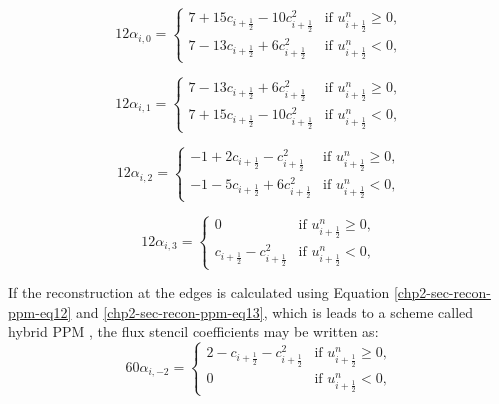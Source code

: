 \begin{equation*}
	12\alpha_{i,0} =  
    	\begin{cases}
		7 + 15c_{i+\frac{1}{2}} - 10c_{i+\frac{1}{2}}^2 
		& \text{if } u_{i+\frac{1}{2}}^n \geq 0,\\
		7 - 13c_{i+\frac{1}{2}}  +  6c_{i+\frac{1}{2}}^2 & \text{if } u_{i+\frac{1}{2}}^n<0,
    	\end{cases}
\end{equation*}

\begin{equation*}
	12\alpha_{i,1} =  
    	\begin{cases}
		7 - 13c_{i+\frac{1}{2}} +  6c_{i+\frac{1}{2}}^2 & \text{if } u_{i+\frac{1}{2}}^n \geq 0,\\
		7 + 15c_{i+\frac{1}{2}} - 10c_{i+\frac{1}{2}}^2 & \text{if } u_{i+\frac{1}{2}}^n<0,
    	\end{cases}
\end{equation*}

\begin{equation*}
	12\alpha_{i,2} =  
    	\begin{cases}
		-1 +  2c_{i+\frac{1}{2}} -   c_{i+\frac{1}{2}}^2 
		& \text{if } u_{i+\frac{1}{2}}^n \geq 0,\\
		-1 - 5c_{i+\frac{1}{2}} +  6c_{i+\frac{1}{2}}^2 & \text{if } u_{i+\frac{1}{2}}^n<0,
    	\end{cases}
\end{equation*}

\begin{equation*}
	12\alpha_{i,3} =  
    	\begin{cases}
		0 & \text{if } u_{i+\frac{1}{2}}^n \geq 0,\\
		c_{i+\frac{1}{2}}-   c_{i+\frac{1}{2}}^2 & \text{if } u_{i+\frac{1}{2}}^n<0,
    	\end{cases}
\end{equation*}

If the reconstruction at the edges is calculated using Equation \eqref{chp2-sec-recon-ppm-eq12}
and \eqref{chp2-sec-recon-ppm-eq13}, which is leads to a scheme called hybrid PPM \citep{putman:2007}, 
the flux stencil coefficients may be written as:
\begin{equation*}
	60\alpha_{i,-2} =  
    	\begin{cases}
		2 - c_{i+\frac{1}{2}}-c_{i+\frac{1}{2}}^2 &
		\text{if } u_{i+\frac{1}{2}}^n \geq 0,\\
		0 & \text{if } u_{i+\frac{1}{2}}^n<0,
    	\end{cases}
\end{equation*}

